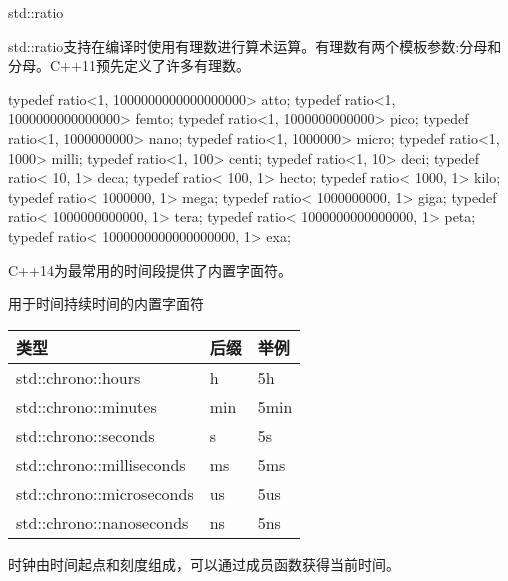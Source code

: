 \begin{myNotic}{std::ratio}
	
std::ratio支持在编译时使用有理数进行算术运算。有理数有两个模板参数:分母和分母。C++11预先定义了许多有理数。
	
\begin{cpp}
typedef ratio<1, 1000000000000000000> atto;
typedef ratio<1, 1000000000000000> femto;
typedef ratio<1, 1000000000000> pico;
typedef ratio<1, 1000000000> nano;
typedef ratio<1, 1000000> micro;
typedef ratio<1, 1000> milli;
typedef ratio<1, 100> centi;
typedef ratio<1, 10> deci;
typedef ratio< 10, 1> deca;
typedef ratio< 100, 1> hecto;
typedef ratio< 1000, 1> kilo;
typedef ratio< 1000000, 1> mega;
typedef ratio< 1000000000, 1> giga;
typedef ratio< 1000000000000, 1> tera;
typedef ratio< 1000000000000000, 1> peta;
typedef ratio< 1000000000000000000, 1> exa;
\end{cpp}
	
\end{myNotic}

C++14为最常用的时间段提供了内置字面符。

\begin{center}
用于时间持续时间的内置字面符
\end{center}

\begin{longtable}[c]{|l|l|l|}
\hline
\textbf{类型}             & \textbf{后缀} & \textbf{举例} \\ \hline
\endfirsthead
%
\endhead
%
std::chrono::hours        & h               & 5h               \\ \hline
std::chrono::minutes      & min             & 5min             \\ \hline
std::chrono::seconds      & s               & 5s               \\ \hline
std::chrono::milliseconds & ms              & 5ms              \\ \hline
std::chrono::microseconds & us              & 5us              \\ \hline
std::chrono::nanoseconds  & ns              & 5ns             \\ \hline
\end{longtable}


时钟由时间起点和刻度组成，可以通过成员函数获得当前时间。

